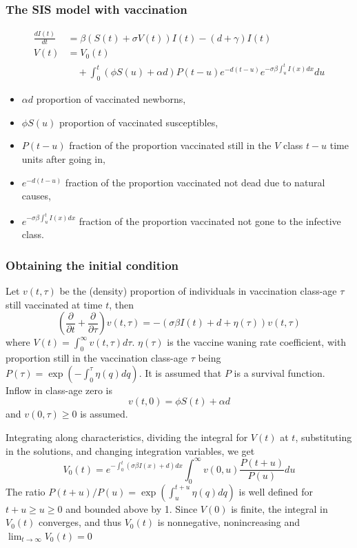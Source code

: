 \documentclass[aspectratio=43]{beamer}
\begin{document}
\begin{frame}\frametitle{The SIS model with vaccination} 
\begin{subequations}\label{genmodel}
\begin{align}
  \frac{dI(t)}{dt}&= \beta(S(t)+\sigma V(t))I(t)-(d+\gamma)I(t)
  \label{genmodelI}\\ 
  V(t)&= V_0(t) \label{genmodelV} \\
  &\quad +\int_0^t(\phi S(u)+\alpha d)P(t-u)e^{-d(t-u)}
  e^{-\sigma\beta\int_u^tI(x)dx}du \nonumber
\end{align}
\end{subequations}
\vfill
\begin{itemize}
\item $\alpha d$ proportion of vaccinated newborns,
\item $\phi S(u)$ proportion of vaccinated susceptibles, 
\item $P(t-u)$ fraction of the proportion vaccinated still in the $V$
  class $t-u$ time units after going in,
\item $e^{-d(t-u)}$ fraction of the proportion vaccinated
not dead due to natural causes,
\item $e^{-\sigma\beta\int_u^t I(x)dx}$ fraction of the proportion
  vaccinated not gone to the infective class.
\end{itemize} 
\end{frame}

\begin{frame}\frametitle{Obtaining the initial condition}
Let $v(t,\tau)$ be the (density) proportion of individuals in vaccination class-age $\tau$ still vaccinated at time $t$,
then
\[
\left(\frac{\partial}{\partial t}+\frac{\partial}{\partial\tau}\right)
v(t,\tau)=
-(\sigma\beta I(t)+d+\eta(\tau))v(t,\tau)
\]
where $V(t)=\int_0^\infty v(t,\tau)d\tau$. $\eta(\tau)$ is the vaccine waning rate coefficient, with proportion still in the vaccination class-age $\tau$ being $P(\tau)=\exp\left(-\int_0^\tau\eta(q)dq\right)$.
It is assumed that $P$ is a survival function.
\vfill
Inflow in class-age zero is 
\[
v(t,0)=\phi S(t)+\alpha d
\]
and $v(0,\tau)\geq 0$ is assumed.
\end{frame}

\begin{frame}
Integrating along characteristics, dividing the integral for $V(t)$ at $t$, substituting in the solutions, and changing integration variables, we get
\begin{equation}
V_0(t)=e^{-\int_0^t(\sigma\beta I(x)+d)dx} \int_0^\infty
v(0,u)\frac{P(t+u)}{P(u)}du 
\label{eq:V0}
\end{equation}
The ratio $P(t+u)/P(u)=\exp\left(\int_u^{t+u}\eta(q)dq\right)$ is well defined for $t+u\geq u\geq 0$ and bounded above by 1. 
\vfill
Since $V(0)$ is finite, the integral in $V_0(t)$ converges, and thus $V_0(t)$ is nonnegative,
nonincreasing and $\lim_{t\to\infty}V_0(t)=0$
\end{frame}
\end{document}
